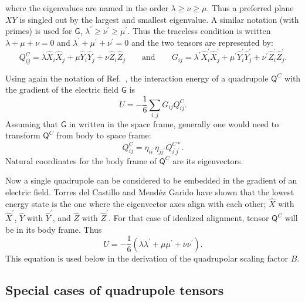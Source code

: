 where the eigenvalues are named in the order $\lambda \ge \nu \ge \mu$.  Thus a preferred plane $XY$ is singled out by the largest
and smallest eigenvalue.  A similar notation (with primes) is used for $\mathsf{G}$, $\lambda^\prime \ge \nu^\prime \ge \mu^\prime$.
Thus the traceless condition is written $\lambda+\mu+\nu=0$ and $\lambda^\prime+\mu^\prime+\nu^\prime=0$  and the 
two tensors are represented by:
\begin{equation*}
Q_{ij}^C=\lambda \hat{X}_i  \hat{X}_j + \mu \hat{Y}_i \hat{Y}_j + \nu \hat{Z}_i  \hat{Z}_j
\qquad \textrm{and} \qquad
G_{ij}=\lambda^\prime \hat{X}^\prime_i  \hat{X}^\prime_j 
+ \mu^\prime \hat{Y}^\prime_i \hat{Y}^\prime_j + \nu^\prime \hat{Z}^\prime_i  \hat{Z}_j^\prime  .
\end{equation*}

Using again the notation of Ref.~\cite{Torres-del-Castillo:2006uo}, the interaction energy of a quadrupole $\mathsf{Q}^C$ with the gradient of the 
electric field $\mathsf{G}$ is
\begin{equation*}
U=-\frac{1}{6}\sum_{i,j} G_{ij} Q^C_{ij}  .
\end{equation*}
Assuming that $\mathsf{G}$ in written in the space frame, 
generally one would need to transform $\mathsf{Q}^C$
from body to space frame:
\begin{equation*}
Q^C_{ij} = \eta_{i i^{\prime}} \eta_{j j^{\prime}} Q_{i^{\prime} j^{\prime}}^{C*}  .
\end{equation*}
Natural coordinates for the body frame of $\mathsf{Q}^C$ are its eigenvectors.

Now a single quadrupole can be considered to be embedded in the gradient of an electric field.
Torres del Castillo and Mend\'{e}z  Garido have shown that the lowest energy state is the one where the eigenvector axes align with each other;
$\hat{X}$ with $\hat{X}^\prime$, $\hat{Y}$ with $\hat{Y}^\prime$, and $\hat{Z}$ with $\hat{Z}^\prime$.
For that case of idealized alignment, tensor $\mathsf{Q}^C$ will be in its body frame.  Thus
\begin{equation*}
U=-\frac{1}{6} (\lambda \lambda^\prime + \mu \mu^\prime +\nu \nu^\prime)  .
\end{equation*}
This equation is used below in the derivation of the quadrupolar scaling factor $B$.

\subsection{Special cases of quadrupole tensors}

